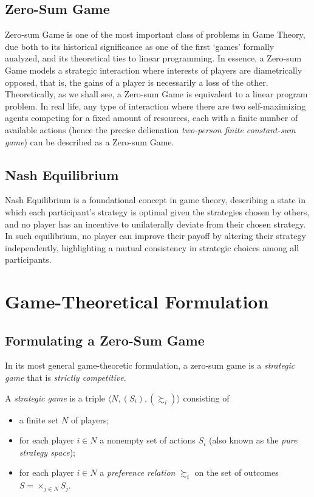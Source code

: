 \documentclass[11pt,reqno, a4]{amsart}
\begin{document}
\subsection{Zero-Sum Game}
Zero-sum Game is one of the most important class of problems in Game Theory, due both to its historical significance as one of the first `games' formally analyzed, and its theoretical ties to linear programming. In essence, a Zero-sum Game models a strategic interaction where interests of players are diametrically opposed, that is, the gains of a player is necessarily a loss of the other. Theoretically, as we shall see, a Zero-sum Game is equivalent to a linear program problem. In real life, any type of interaction where there are two self-maximizing agents competing for a fixed amount of resources, each with a finite number of available actions (hence the precise delienation \textit{two-person finite constant-sum game}) can be described as a Zero-sum Game.


\subsection{Nash Equilibrium}
Nash Equilibrium is a foundational concept in game theory, describing a state in which each participant's strategy is optimal given the strategies chosen by others, and no player has an incentive to unilaterally deviate from their chosen strategy. In such equilibrium, no player can improve their payoff by altering their strategy independently, highlighting a mutual consistency in strategic choices among all participants.

\section{Game-Theoretical Formulation}
\subsection{Formulating a Zero-Sum Game}
In its most general game-theoretic formulation, a zero-sum game is a \textit{strategic game} that is \textit{strictly competitive}. 
\begin{definition} A \textit{strategic game} is a triple $\langle N, (S_i), (\succsim_i) \rangle$ consisting of
\begin{itemize}
    \item a finite set $N$ of players;
    \item for each player $i \in N$ a nonempty set of actions $S_i$ (also known as the \textit{pure strategy space});
    \item for each player $i \in N$ a \textit{preference relation} $\succsim_i$ on the set of outcomes $S = \times_{j \in N}S_j$.
\end{itemize}
\end{definition}
\end{document}
